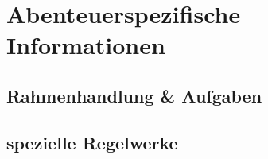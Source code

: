 \section*{Abenteuerspezifische Informationen}

\subsection*{Rahmenhandlung \& Aufgaben}

\subsection*{spezielle Regelwerke}

